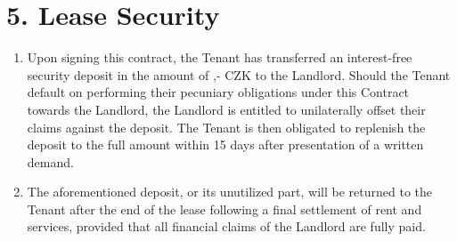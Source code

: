 \section*{5. Lease Security}

\begin{enumerate}[label=\arabic*.]
    \item Upon signing this contract, the Tenant has transferred an interest-free security deposit in the amount of \DepositAmount,- CZK to the Landlord. Should the Tenant default on performing their pecuniary obligations under this Contract towards the Landlord, the Landlord is entitled to unilaterally offset their claims against the deposit. The Tenant is then obligated to replenish the deposit to the full amount within 15 days after presentation of a written demand.
    \item The aforementioned deposit, or its unutilized part, will be returned to the Tenant after the end of the lease following a final settlement of rent and services, provided that all financial claims of the Landlord are fully paid.
\end{enumerate}
